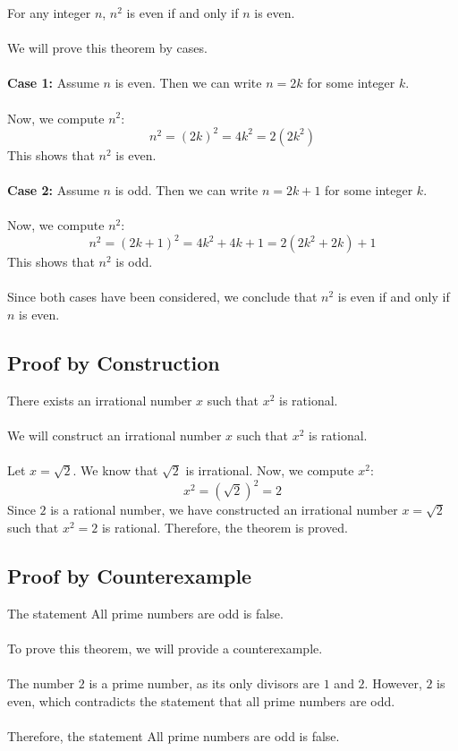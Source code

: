 For any integer \( n \), \( n^2 \) is even if and only if \( n \) is even.
\\\\
	We will prove this theorem by cases.
\\\\
	\textbf{Case 1:} Assume \( n \) is even. Then we can write \( n = 2k \) for some integer \( k \).
\\\\
	Now, we compute \( n^2 \):
	\[
		n^2 = {(2k)}^2 = 4k^2 = 2(2k^2)
	\]
	This shows that \( n^2 \) is even.
\\\\
	\textbf{Case 2:} Assume \( n \) is odd. Then we can write \( n = 2k + 1 \) for some integer \( k \).
\\\\
	Now, we compute \( n^2 \):
	\[
		n^2 = {(2k + 1)}^2 = 4k^2 + 4k + 1 = 2(2k^2 + 2k) + 1
	\]
	This shows that \( n^2 \) is odd.
\\\\
	Since both cases have been considered, we conclude that \( n^2 \) is even if and only if \( n \) is even.
\QED

\subsection{Proof by Construction}

There exists an irrational number \( x \) such that \( x^2 \) is rational.
\\\\
	We will construct an irrational number \( x \) such that \( x^2 \) is rational.
\\\\
	Let \( x = \sqrt{2} \). We know that \( \sqrt{2} \) is irrational. Now, we compute \( x^2 \):
	\[
		x^2 = (\sqrt{2})^2 = 2
	\]
	Since \( 2 \) is a rational number, we have constructed an irrational number \( x = \sqrt{2} \) such that \( x^2 = 2 \) is rational.
	Therefore, the theorem is proved.

\QED

\subsection{Proof by Counterexample}

The statement All prime numbers are odd is false.
\\\\
	To prove this theorem, we will provide a counterexample.
\\\\
	The number \( 2 \) is a prime number, as its only divisors are \( 1 \) and \( 2 \). However, \( 2 \) is even, which contradicts the statement that all prime numbers are odd.
\\\\
	Therefore, the statement All prime numbers are odd is false.
\QED

